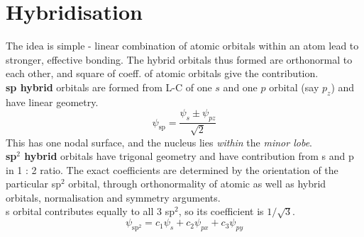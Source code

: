 \documentclass[11pt]{article}
\begin{document}
\section*{Hybridisation}
The idea is simple - linear combination of atomic orbitals within an atom lead to stronger, effective bonding. The hybrid orbitals thus formed are orthonormal to each other, and square of coeff. of atomic orbitals give the contribution. \\
\textbf{sp hybrid} orbitals are formed from L-C of one $s$ and one $p$ orbital (say $p_z$) and have linear geometry. \[\psi_{\textrm{sp}} = \frac{\psi_s \pm \psi_{pz}}{\sqrt{2}}\]
This has one nodal surface, and the nucleus lies \emph{within} the \emph{minor lobe}.\\
\textbf{sp$^2$ hybrid} orbitals have trigonal geometry and have contribution from s and p in 1 : 2 ratio. The exact coefficients are determined by the orientation of the particular sp$^2$ orbital, through orthonormality of atomic as well as hybrid orbitals, normalisation and symmetry arguments. \\
s orbital contributes equally to all 3 sp$^2$, so its coefficient is $1/\sqrt{3}$.
\[\boxed{\psi_{\textrm{sp}^2} = c_1\psi_s + c_2\psi_{px} +c _3\psi_{py} } \]
\end{document}
